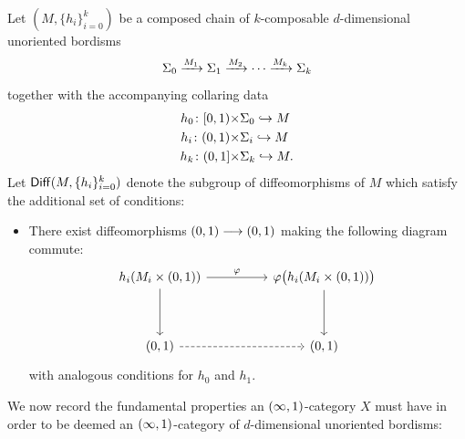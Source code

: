 \begin{definition}\label{ch3:: def: diffeo group}
    Let $(M,\{h_i\}_{i=0}^{k})$ be a composed chain of $k$-composable $d$-dimensional unoriented bordisms 
    \begin{equation}
        \Sigma_0 \xrightarrow{M_1} \Sigma_1 \xrightarrow{M_2} \cdots \xrightarrow{M_{k}} \Sigma_k 
    \end{equation}
    together with the accompanying collaring data 
    \begin{align}
        h_0 \colon [0,1) \times &\Sigma_0 \hookrightarrow M \\
        h_i \colon (0,1) \times &\Sigma_i \hookrightarrow M \\
        h_k \colon (0,1]  \times &\Sigma_k \hookrightarrow M.
    \end{align}
    Let $\operatorname{{\sf Diff}}(M,\{h_i\}_{i=0}^{k})$ denote the subgroup of diffeomorphisms of $M$ which satisfy the additional set of conditions:
    \begin{itemize}
        \item[$(*)$] There exist diffeomorphisms $(0,1) \longrightarrow (0,1)$ making the following diagram commute:
        \begin{equation}
            \begin{tikzcd}
                {h_i(M_{i}\times(0,1))} && {\varphi\big(h_i(M_{i}\times(0,1))\big)} \\
                \\
                {(0,1)} && {(0,1)}
                \arrow["\varphi", from=1-1, to=1-3]
                \arrow[from=1-1, to=3-1]
                \arrow[from=1-3, to=3-3]
                \arrow[dashed, from=3-1, to=3-3]
            \end{tikzcd}
        \end{equation} 
        with analogous conditions for $h_0$ and $h_1$.
    \end{itemize}
\end{definition}




We now record the fundamental properties an $(\operatorname{\infty},1)$-category $X$ must have in order to be deemed an $(\operatorname{\infty},1)$-category of $d$-dimensional unoriented bordisms: 

